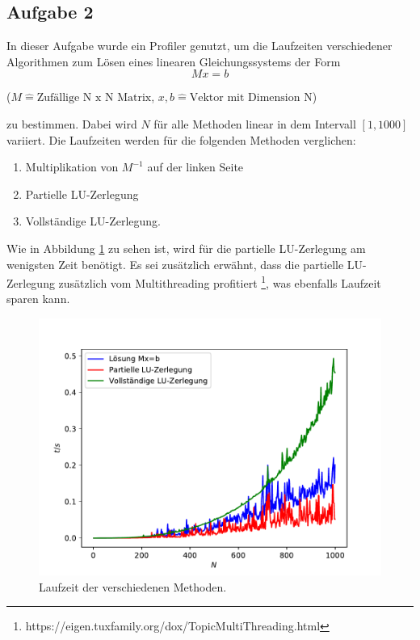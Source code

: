 \documentclass{scrartcl}
\begin{document}
        \subsection*{Aufgabe 2}
        In dieser Aufgabe wurde ein Profiler genutzt, um die Laufzeiten verschiedener Algorithmen zum Lösen eines linearen Gleichungssystems der Form 
        \begin{equation}
            Mx=b
        \end{equation}
        \begin{center}
            \tiny{($M \hat{=} \text{Zufällige N x N Matrix}$, $x, b \hat{=} \text{Vektor mit Dimension N}$)}
        \end{center}
        zu bestimmen. Dabei wird $N$ für alle Methoden linear in dem Intervall $[1, 1000]$ variiert. 
        Die Laufzeiten werden für die folgenden Methoden verglichen: 
        \begin{enumerate}
            \item Multiplikation von $M^{-1}$ auf der linken Seite \label{M1}
            \item Partielle LU-Zerlegung
            \item Vollständige LU-Zerlegung.
        \end{enumerate} 
        Wie in Abbildung \ref{fig:A3times} zu sehen ist, wird für die partielle LU-Zerlegung am wenigsten Zeit benötigt. Es sei zusätzlich erwähnt, dass die partielle LU-Zerlegung zusätzlich vom Multithreading profitiert \footnote[1]{https://eigen.tuxfamily.org/dox/TopicMultiThreading.html}, was ebenfalls Laufzeit sparen kann.

        \begin{figure}[H]
            \centering
            \includegraphics[scale=0.7]{A3/build/timers.pdf}
            \caption{Laufzeit der verschiedenen Methoden.}
            \label{fig:A3times}
        \end{figure}
\end{document}
